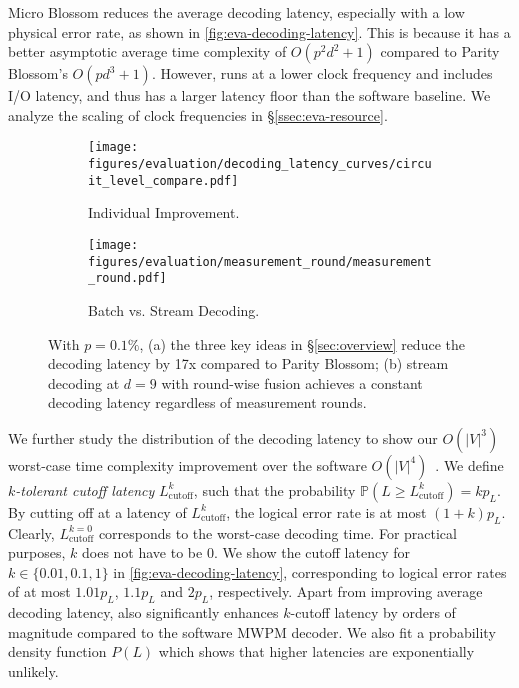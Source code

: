 Micro Blossom reduces the average decoding latency, especially with a low physical error rate, as shown in \autoref{fig:eva-decoding-latency}.
This is because it has a better asymptotic average time complexity of $O(p^2 d^2 + 1)$ compared to Parity Blossom's $O(p d^3 + 1)$.
However, \system runs at a lower clock frequency and includes I/O latency, and thus has a larger latency floor than the software baseline.
We analyze the scaling of clock frequencies in \S\ref{ssec:eva-resource}.


\begin{figure}[tb]
    \centering
    \begin{minipage}{\linewidth}
        \newcommand{\subsubfigurewidth}{0.99\linewidth}
        \renewcommand*\thesubfigure{\alph{subfigure}}  %
        \centering
        \begin{subfigure}{.495\linewidth}
            \centering
            \texttt{[image: figures/evaluation/decoding\_latency\_curves/circuit\_level\_compare.pdf]}
            \caption{Individual Improvement.}
            \label{fig:individual-techniques}
        \end{subfigure}
        \begin{subfigure}{.495\linewidth}
            \centering
            \texttt{[image: figures/evaluation/measurement\_round/measurement\_round.pdf]}
            \caption{Batch vs. Stream Decoding.}
            \label{fig:stream-vs-batch-decoding}
        \end{subfigure}
        \caption{With $p=0.1\%$, (a) the three key ideas in \S\ref{sec:overview} reduce the decoding latency by 17x compared to Parity Blossom; (b) stream decoding at $d=9$ with round-wise fusion achieves a constant decoding latency regardless of measurement rounds.}
        \label{fig:compare}
    \end{minipage}
\end{figure}

We further study the distribution of the decoding latency to show our $O(|V|^3)$ worst-case time complexity improvement over the software $O(|V|^4)$~\cite{higgott2025sparse}.
We define \emph{$k$-tolerant cutoff latency} $L^{k}_{\text{cutoff}}$, such that the probability $\mathbb{P}(L \ge L^{k}_{\text{cutoff}}) = k p_L$.
By cutting off at a latency of $L^{k}_{\text{cutoff}}$, the logical error rate is at most $(1+k) p_L$.
Clearly, $L^{k=0}_{\text{cutoff}}$ corresponds to the worst-case decoding time.
For practical purposes, $k$ does not have to be 0.
We show the cutoff latency for $k \in \{ 0.01, 0.1, 1 \}$ in \autoref{fig:eva-decoding-latency}, corresponding to logical error rates of at most $1.01 p_L$, $1.1p_L$ and $2p_L$, respectively.
Apart from improving average decoding latency, \system also significantly enhances $k$-cutoff latency by orders of magnitude compared to the software MWPM decoder.
We also fit a probability density function $P(L)$ which shows that higher latencies are exponentially unlikely.

